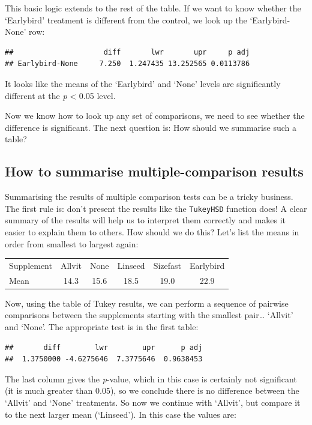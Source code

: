 \documentclass[
]{book}
\begin{document}
This basic logic extends to the rest of the table. If we want to know whether the `Earlybird' treatment is different from the control, we look up the `Earlybird-None' row:

\begin{verbatim}
##                     diff       lwr       upr     p adj 
## Earlybird-None     7.250  1.247435 13.252565 0.0113786
\end{verbatim}

It looks like the means of the `Earlybird' and `None' levels are significantly different at the \emph{p} \textless{} 0.05 level.

Now we know how to look up any set of comparisons, we need to see whether the difference is significant. The next question is: How should we summarise such a table?

\hypertarget{how-to-summarise-multiple-comparison-results}{%
\subsection{How to summarise multiple-comparison results}\label{how-to-summarise-multiple-comparison-results}}

Summarising the results of multiple comparison tests can be a tricky business. The first rule is: don't present the results like the \texttt{TukeyHSD} function does! A clear summary of the results will help us to interpret them correctly and makes it easier to explain them to others. How should we do this? Let's list the means in order from smallest to largest again:

\begin{longtable}[]{@{}lccccc@{}}
\toprule
& & & & & \\
\midrule
\endhead
Supplement & Allvit & None & Linseed & Sizefast & Earlybird \\
Mean & 14.3 & 15.6 & 18.5 & 19.0 & 22.9 \\
\bottomrule
\end{longtable}

Now, using the table of Tukey results, we can perform a sequence of pairwise comparisons between the supplements starting with the smallest pair\ldots{} `Allvit' and `None'. The appropriate test is in the first table:

\begin{verbatim}
##       diff        lwr        upr      p adj 
##  1.3750000 -4.6275646  7.3775646  0.9638453
\end{verbatim}

The last column gives the \emph{p}-value, which in this case is certainly not significant (it is much greater than 0.05), so we conclude there is no difference between the `Allvit' and `None' treatments. So now we continue with `Allvit', but compare it to the next larger mean (`Linseed'). In this case the values are:
\end{document}

